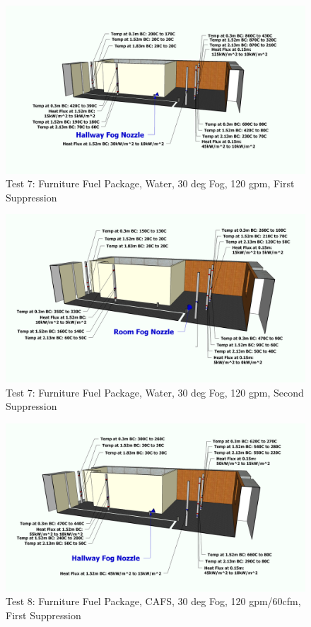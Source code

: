 \documentclass[12pt,oneside]{book}
\begin{document}
\clearpage

\begin{figure}[!ht]
	\includegraphics[width=6in]{../Figures/Pictures/Metric/DelCoFogTest7FirstSuppression}
	\caption{Test 7: Furniture Fuel Package, Water, 30 deg Fog, 120 gpm, First Suppression}
	\label{fig:Test_7_First_Suppression}
\end{figure}

\begin{figure}[!ht]
	\includegraphics[width=6in]{../Figures/Pictures/Metric/DelCoFogTest7SecondSuppression}
	\caption{Test 7: Furniture Fuel Package, Water, 30 deg Fog, 120 gpm, Second Suppression}
	\label{fig:Test_7_Second_Suppression}
\end{figure}

\begin{figure}[!ht]
	\includegraphics[width=6in]{../Figures/Pictures/Metric/DelCoFogTest8FirstSuppression}
	\caption{Test 8: Furniture Fuel Package, CAFS, 30 deg Fog, 120 gpm/60cfm, First Suppression}
	\label{fig:Test_8_First_Suppression}
\end{figure}
\end{document}
